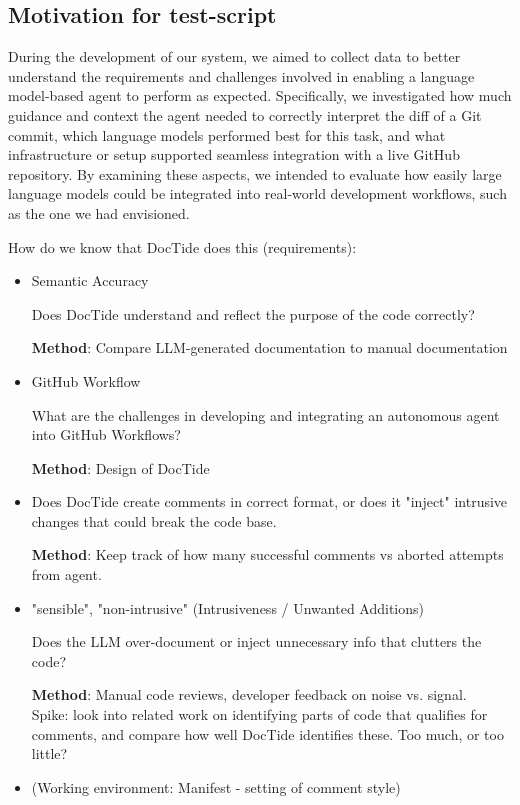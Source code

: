 \subsection{Motivation for test-script}
During the development of our system, we aimed to collect data to better understand the requirements and challenges involved in enabling a language model-based agent to perform as expected. Specifically, we investigated how much guidance and context the agent needed to correctly interpret the diff of a Git commit, which language models performed best for this task, and what infrastructure or setup supported seamless integration with a live GitHub repository. By examining these aspects, we intended to evaluate how easily large language models could be integrated into real-world development workflows, such as the one we had envisioned.

How do we know that DocTide does this (requirements):
\begin{itemize}
    \item Semantic Accuracy
    
    Does DocTide understand and reflect the purpose of the code correctly?

    \textbf{Method}: Compare LLM-generated documentation to manual documentation
    
    \item GitHub Workflow

    What are the challenges in developing and integrating an autonomous agent into GitHub Workflows?

    \textbf{Method}: Design of DocTide
    
    \item 

    Does DocTide create comments in correct format, or does it "inject" intrusive changes that could break the code base.
    
    \textbf{Method}: Keep track of how many successful comments vs aborted attempts from agent.
    \item "sensible", "non-intrusive" (Intrusiveness / Unwanted Additions)

    Does the LLM over-document or inject unnecessary info that clutters the code?

    \textbf{Method}: Manual code reviews, developer feedback on noise vs. signal.
    \\
    Spike: look into related work on identifying parts of code that qualifies for comments, and compare how well DocTide identifies these. Too much, or too little?
    \item (Working environment: Manifest - setting of comment style)
\end{itemize}